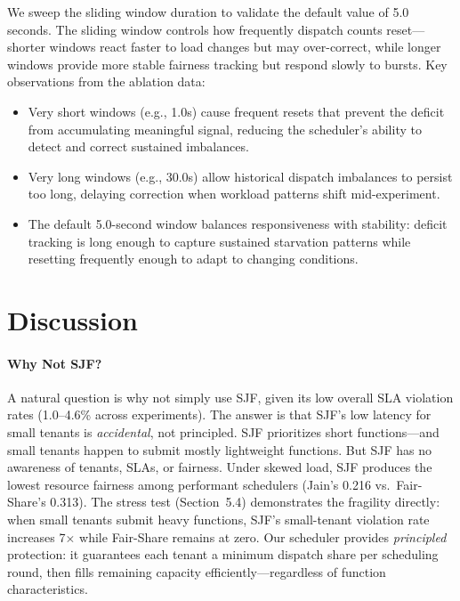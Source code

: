 \documentclass[runningheads]{llncs}
\begin{document}
We sweep the sliding window duration to validate the default value of 5.0 seconds. The sliding window controls how frequently dispatch counts reset---shorter windows react faster to load changes but may over-correct, while longer windows provide more stable fairness tracking but respond slowly to bursts. Key observations from the ablation data:
\begin{itemize}
    \item Very short windows (e.g., 1.0s) cause frequent resets that prevent the deficit from accumulating meaningful signal, reducing the scheduler's ability to detect and correct sustained imbalances.
    \item Very long windows (e.g., 30.0s) allow historical dispatch imbalances to persist too long, delaying correction when workload patterns shift mid-experiment.
    \item The default 5.0-second window balances responsiveness with stability: deficit tracking is long enough to capture sustained starvation patterns while resetting frequently enough to adapt to changing conditions.
\end{itemize}

\section{Discussion}\label{sec:discussion}

\paragraph{Why Not SJF?}
A natural question is why not simply use SJF, given its low overall SLA violation rates (1.0--4.6\% across experiments). The answer is that SJF's low latency for small tenants is \emph{accidental}, not principled. SJF prioritizes short functions---and small tenants happen to submit mostly lightweight functions. But SJF has no awareness of tenants, SLAs, or fairness. Under skewed load, SJF produces the lowest resource fairness among performant schedulers (Jain's 0.216 vs.\ Fair-Share's 0.313). The stress test (Section~5.4) demonstrates the fragility directly: when small tenants submit heavy functions, SJF's small-tenant violation rate increases 7$\times$ while Fair-Share remains at zero. Our scheduler provides \emph{principled} protection: it guarantees each tenant a minimum dispatch share per scheduling round, then fills remaining capacity efficiently---regardless of function characteristics.
\end{document}
